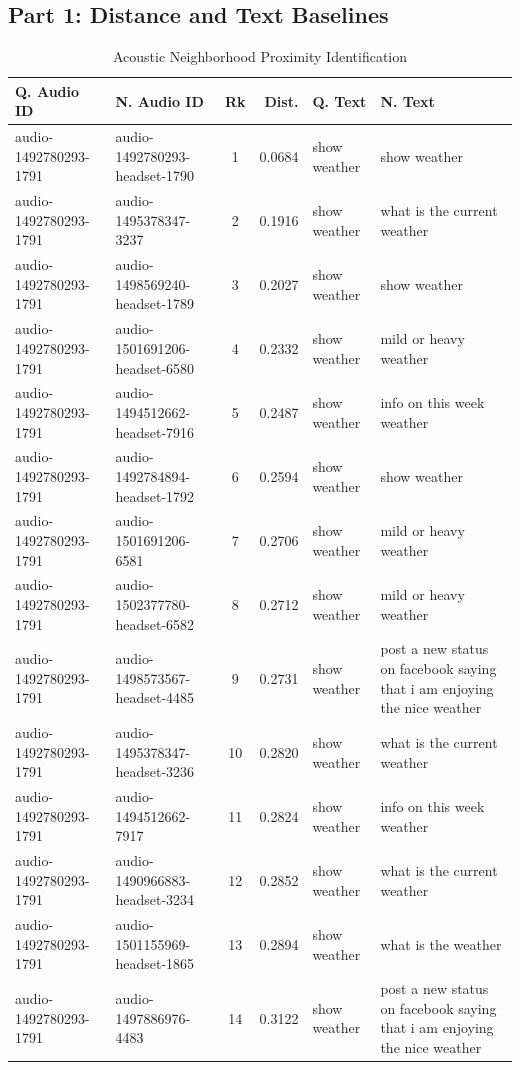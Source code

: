\subsection*{Part 1: Distance and Text Baselines}
{\small
\begin{longtable}{p{2.6cm} p{2.6cm} c r p{3.4cm} p{3.4cm}}
\caption{Acoustic Neighborhood Proximity Identification} \\
\toprule
\textbf{Q. Audio ID} & \textbf{N. Audio ID} & \textbf{Rk} & \textbf{Dist.} & \textbf{Q. Text} & \textbf{N. Text} \\
\midrule
audio-1492780293-1791 & audio-1492780293-headset-1790 & 1 & 0.0684 & show weather & show weather \\
audio-1492780293-1791 & audio-1495378347-3237 & 2 & 0.1916 & show weather & what is the current weather \\
audio-1492780293-1791 & audio-1498569240-headset-1789 & 3 & 0.2027 & show weather & show weather \\
audio-1492780293-1791 & audio-1501691206-headset-6580 & 4 & 0.2332 & show weather & mild or heavy weather \\
audio-1492780293-1791 & audio-1494512662-headset-7916 & 5 & 0.2487 & show weather & info on this week weather \\
audio-1492780293-1791 & audio-1492784894-headset-1792 & 6 & 0.2594 & show weather & show weather \\
audio-1492780293-1791 & audio-1501691206-6581 & 7 & 0.2706 & show weather & mild or heavy weather \\
audio-1492780293-1791 & audio-1502377780-headset-6582 & 8 & 0.2712 & show weather & mild or heavy weather \\
audio-1492780293-1791 & audio-1498573567-headset-4485 & 9 & 0.2731 & show weather & post a new status on facebook saying that i am enjoying the nice weather \\
audio-1492780293-1791 & audio-1495378347-headset-3236 & 10 & 0.2820 & show weather & what is the current weather \\
audio-1492780293-1791 & audio-1494512662-7917 & 11 & 0.2824 & show weather & info on this week weather \\
audio-1492780293-1791 & audio-1490966883-headset-3234 & 12 & 0.2852 & show weather & what is the current weather \\
audio-1492780293-1791 & audio-1501155969-headset-1865 & 13 & 0.2894 & show weather & what is the weather \\
audio-1492780293-1791 & audio-1497886976-4483 & 14 & 0.3122 & show weather & post a new status on facebook saying that i am enjoying the nice weather \\

\end{longtable}}
